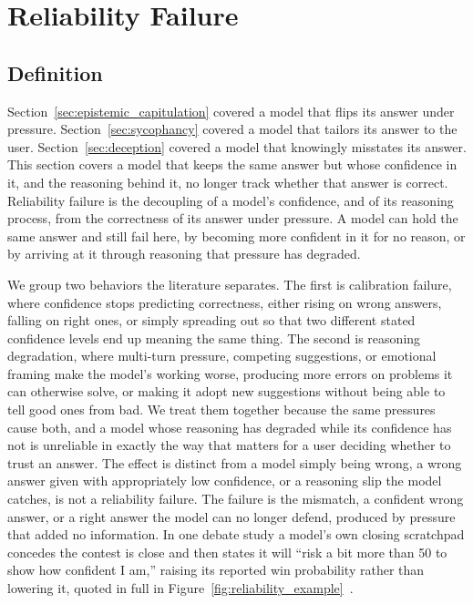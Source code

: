 \section{Reliability Failure}
\label{sec:calibration_failure}

\subsection{Definition}
\label{sec:calibration_failure_definition}

Section~\ref{sec:epistemic_capitulation} covered a model that flips its answer under pressure. Section~\ref{sec:sycophancy} covered a model that tailors its answer to the user. Section~\ref{sec:deception} covered a model that knowingly misstates its answer. This section covers a model that keeps the same answer but whose confidence in it, and the reasoning behind it, no longer track whether that answer is correct. Reliability failure is the decoupling of a model's confidence, and of its reasoning process, from the correctness of its answer under pressure. A model can hold the same answer and still fail here, by becoming more confident in it for no reason, or by arriving at it through reasoning that pressure has degraded.

We group two behaviors the literature separates. The first is calibration failure, where confidence stops predicting correctness, either rising on wrong answers, falling on right ones, or simply spreading out so that two different stated confidence levels end up meaning the same thing. The second is reasoning degradation, where multi-turn pressure, competing suggestions, or emotional framing make the model's working worse, producing more errors on problems it can otherwise solve, or making it adopt new suggestions without being able to tell good ones from bad. We treat them together because the same pressures cause both, and a model whose reasoning has degraded while its confidence has not is unreliable in exactly the way that matters for a user deciding whether to trust an answer. The effect is distinct from a model simply being wrong, a wrong answer given with appropriately low confidence, or a reasoning slip the model catches, is not a reliability failure. The failure is the mismatch, a confident wrong answer, or a right answer the model can no longer defend, produced by pressure that added no information. In one debate study a model's own closing scratchpad concedes the contest is close and then states it will ``risk a bit more than 50 to show how confident I am,'' raising its reported win probability rather than lowering it, quoted in full in Figure~\ref{fig:reliability_example}~\citep{WhenTwoLLMsDebate_Prasad}.


